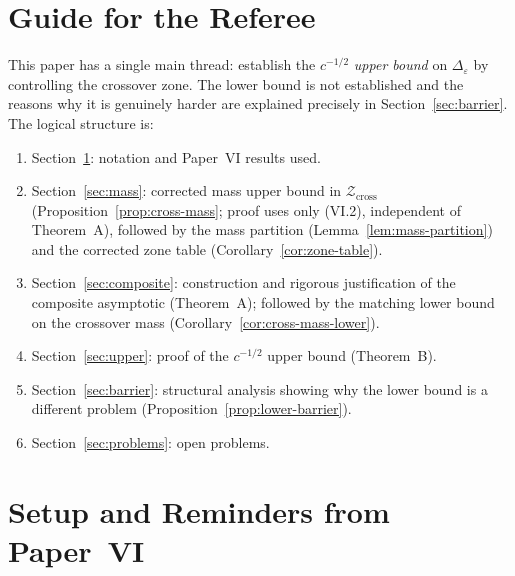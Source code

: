 \documentclass[12pt,a4paper]{amsart}
\theoremstyle{definition}
\theoremstyle{remark}
\newcommand{\Zcross}{\mathcal{Z}_{\mathrm{cross}}}
\begin{document}
\section*{Guide for the Referee}

This paper has a single main thread:
establish the $c^{-1/2}$ \emph{upper bound} on $\Delta_\varepsilon$
by controlling the crossover zone.
The lower bound is not established and the reasons
why it is genuinely harder are explained precisely
in Section~\ref{sec:barrier}.
The logical structure is:
\begin{enumerate}
\item Section~\ref{sec:setup}: notation and
Paper~VI results used.
\item Section~\ref{sec:mass}: corrected mass
upper bound in $\Zcross$
(Proposition~\ref{prop:cross-mass};
proof uses only (VI.2), independent of Theorem~A),
followed by the mass partition
(Lemma~\ref{lem:mass-partition})
and the corrected zone table
(Corollary~\ref{cor:zone-table}).
\item Section~\ref{sec:composite}: construction
and rigorous justification of the composite
asymptotic (Theorem~A);
followed by the matching lower bound on the
crossover mass (Corollary~\ref{cor:cross-mass-lower}).
\item Section~\ref{sec:upper}: proof of the
$c^{-1/2}$ upper bound (Theorem~B).
\item Section~\ref{sec:barrier}: structural
analysis showing why the lower bound is
a different problem (Proposition~\ref{prop:lower-barrier}).
\item Section~\ref{sec:problems}: open problems.
\end{enumerate}

\tableofcontents

\section{Setup and Reminders from Paper~VI}
\label{sec:setup}
\end{document}
